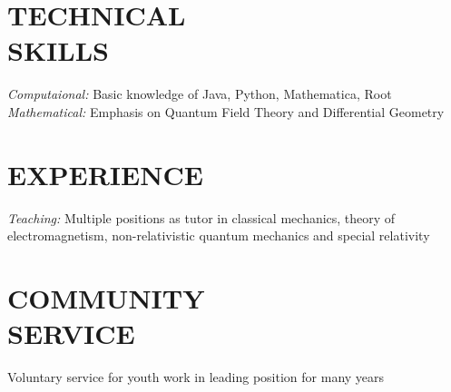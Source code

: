\begin{resume}
\section{TECHNICAL\\ SKILLS} 

{\sl Computaional:} 
Basic knowledge of Java, Python, Mathematica, Root \\
{\sl Mathematical:}  
Emphasis on Quantum Field Theory and Differential Geometry
 
 
\section{EXPERIENCE}

{\sl Teaching:} Multiple positions as tutor in classical mechanics, theory of electromagnetism, non-relativistic quantum mechanics and special relativity

\section{COMMUNITY \\ SERVICE}

Voluntary service for youth work in leading position for many years



\end{resume}